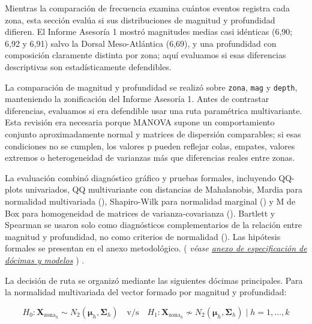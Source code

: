 \documentclass[
  spanish,
  letterpaper,
  DIV=11,
  numbers=noendperiod]{scrartcl}
\newcommand{\asesoriaParenRef}[1]{%
  \textnormal{\textcolor{asesoriaTextColor}{(}}%
  {\hypersetup{linkcolor=asesoriaLinkColor,urlcolor=asesoriaLinkColor,citecolor=asesoriaLinkColor}\textcolor{asesoriaTextColor}{\emph{#1}}}%
  \textnormal{\textcolor{asesoriaTextColor}{)}}%
}
\begin{document}
Mientras la comparación de frecuencia examina cuántos eventos registra
cada zona, esta sección evalúa si sus distribuciones de magnitud y
profundidad difieren. El Informe Asesoría 1 mostró magnitudes medias
casi idénticas (6,90; 6,92 y 6,91) salvo la Dorsal Meso-Atlántica
(6,69), y una profundidad con composición claramente distinta por zona;
aquí evaluamos si esas diferencias descriptivas son estadísticamente
defendibles.

La comparación de magnitud y profundidad se realizó sobre \texttt{zona},
\texttt{mag} y \texttt{depth}, manteniendo la zonificación del Informe
Asesoría 1. Antes de contrastar diferencias, evaluamos si era defendible
usar una ruta paramétrica multivariante. Esta revisión era necesaria
porque MANOVA supone un comportamiento conjunto aproximadamente normal y
matrices de dispersión comparables; si esas condiciones no se cumplen,
los valores p pueden reflejar colas, empates, valores extremos o
heterogeneidad de varianzas más que diferencias reales entre zonas.

La evaluación combinó diagnóstico gráfico y pruebas formales, incluyendo
QQ-plots univariados, QQ multivariante con distancias de Mahalanobis,
Mardia para normalidad multivariada (), Shapiro-Wilk para normalidad marginal
() y M de Box para
homogeneidad de matrices de varianza-covarianza
(). Bartlett y Spearman se usaron solo
como diagnósticos complementarios de la relación entre magnitud y
profundidad, no como criterios de normalidad
(). Las hipótesis formales se
presentan en el anexo metodológico.
\asesoriaParenRef{véase \hyperref[sec-anexo-especificacion]{anexo de especificación de dócimas y modelos}}.

\begingroup
\setlength{\abovedisplayskip}{0pt}
\setlength{\belowdisplayskip}{0pt}
\setlength{\abovedisplayshortskip}{0pt}
\setlength{\belowdisplayshortskip}{0pt}

La decisión de ruta se organizó mediante las siguientes dócimas
principales. Para la normalidad multivariada del vector formado por
magnitud y profundidad:

\vspace{-1.10em}
\[
H_0: \mathbf{X}_{\text{zona}_h}\sim N_2(\boldsymbol{\mu}_h,\boldsymbol{\Sigma}_h)
\quad \text{v/s} \quad
H_1: \mathbf{X}_{\text{zona}_h}\not\sim N_2(\boldsymbol{\mu}_h,\boldsymbol{\Sigma}_h) \mid h=1,\ldots,k
\]
\vspace{-1.15em}
\end{document}
